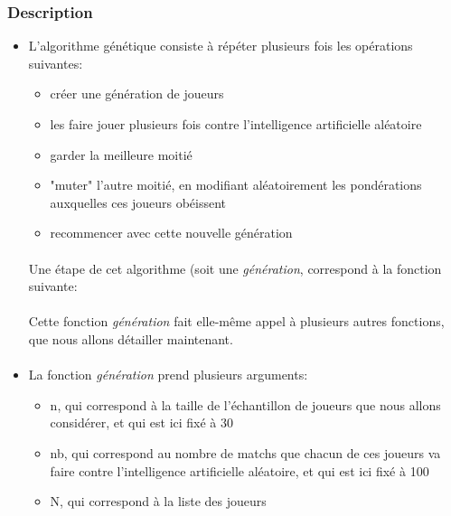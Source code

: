 \documentclass[10pt, french]{article}
\begin{document}
\subsubsection*{Description}
\begin{itemize}
    \item L'algorithme génétique consiste à répéter plusieurs fois les opérations suivantes: 
    \begin{itemize}
        \item créer une génération de joueurs
        \item les faire jouer plusieurs fois contre l'intelligence artificielle aléatoire  
        \item garder la meilleure moitié
        \item "muter" l'autre moitié, en modifiant aléatoirement les pondérations auxquelles ces joueurs obéissent 
        \item recommencer avec cette nouvelle génération
    \end{itemize}
    \paragraph{}
    Une étape de cet algorithme (soit une \textit{génération}, correspond à la fonction suivante: 
    
    \paragraph{}
Cette fonction \textit{génération} fait elle-même appel à plusieurs autres fonctions, que nous allons détailler maintenant. 

\paragraph{}
\item La fonction \textit{génération} prend plusieurs arguments: 
\begin{itemize}
    \item n, qui correspond à la taille de l'échantillon de joueurs que nous allons considérer, et qui est ici fixé à 30
    \item nb, qui correspond au nombre de matchs que chacun de ces joueurs va faire contre l'intelligence artificielle aléatoire, et qui est ici fixé à 100
    \item N, qui correspond à la liste des joueurs 
\end{itemize}


\end{itemize}
\end{document}
